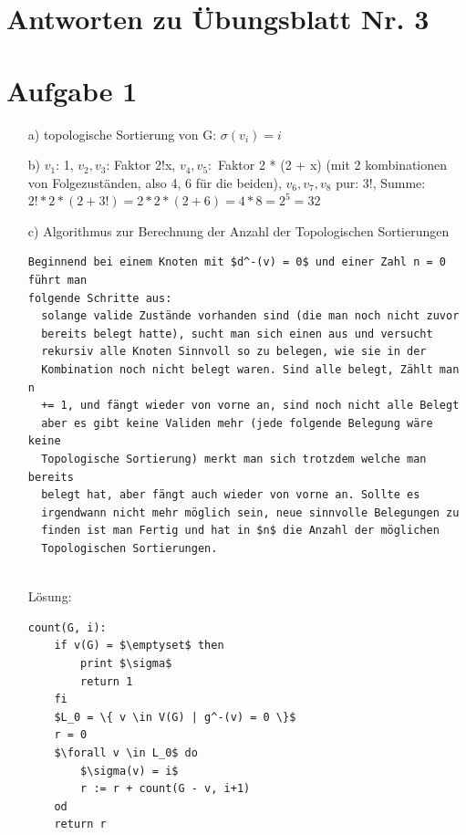 \documentclass{scrartcl}
\begin{document}
\section*{Antworten zu Übungsblatt Nr. 3}

\section*{Aufgabe 1}

\begin{itemize}
    \item[a)] topologische Sortierung von G: $\sigma(v_i) = i$
    \item[b)] $v_1$: 1, $v_2, v_3$: Faktor 2!x, $v_4, v_5:$ Faktor 2 * (2 + x) (mit 2 kombinationen von Folgezuständen, also 4, 6 für die beiden), $v_6, v_7, v_8$ pur: 3!, Summe: $2! * 2 * (2 + 3!) = 2 * 2 * (2 + 6) = 4 * 8 = 2^5 = 32$
    \item[c)] Algorithmus zur Berechnung der Anzahl der Topologischen Sortierungen
        \begin{lstlisting}
Beginnend bei einem Knoten mit $d^-(v) = 0$ und einer Zahl n = 0 führt man
folgende Schritte aus:
  solange valide Zustände vorhanden sind (die man noch nicht zuvor
  bereits belegt hatte), sucht man sich einen aus und versucht
  rekursiv alle Knoten Sinnvoll so zu belegen, wie sie in der
  Kombination noch nicht belegt waren. Sind alle belegt, Zählt man n
  += 1, und fängt wieder von vorne an, sind noch nicht alle Belegt
  aber es gibt keine Validen mehr (jede folgende Belegung wäre keine
  Topologische Sortierung) merkt man sich trotzdem welche man bereits
  belegt hat, aber fängt auch wieder von vorne an. Sollte es
  irgendwann nicht mehr möglich sein, neue sinnvolle Belegungen zu
  finden ist man Fertig und hat in $n$ die Anzahl der möglichen
  Topologischen Sortierungen.
        \end{lstlisting} \\
        Lösung: \\
        \begin{lstlisting}
count(G, i):
    if v(G) = $\emptyset$ then
        print $\sigma$
        return 1
    fi
    $L_0 = \{ v \in V(G) | g^-(v) = 0 \}$
    r = 0
    $\forall v \in L_0$ do
        $\sigma(v) = i$
        r := r + count(G - v, i+1)
    od
    return r

        \end{lstlisting}



\end{itemize}
\end{document}
